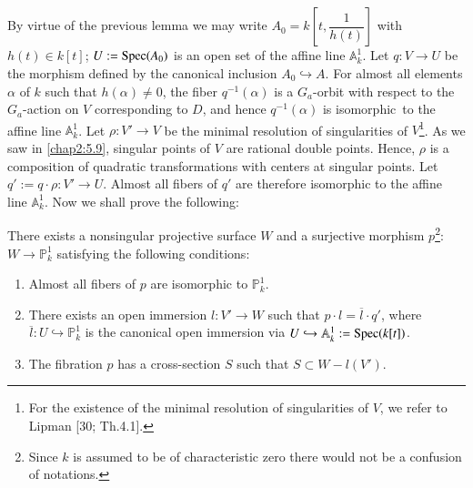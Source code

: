 \subsection{}\label{chap2:5.17}
By virtue of the previous lemma we may write
$A_{0}=k\left[t,\dfrac{1}{h(t)}\right]$ with $h(t)\in k[t]$; $U:=\operatorname{Spec}(A_{0})$ is
an open set of the affine line $\mathbb{A}^{1}_{k}$. Let $q:V\to U$ be
the morphism defined by the canonical inclusion $A_{0}\hookrightarrow
A$. For almost all elements $\alpha$ of $k$ such that $h(\alpha)\neq
0$, the fiber $q^{-1}(\alpha)$ is a $G_{a}$-orbit with respect to the
$G_{a}$-action on $V$ corresponding to $D$, and hence $q^{-1}(\alpha)$
is isomorphic\pageoriginale\ to the affine line
$\mathbb{A}^{1}_{k}$. Let $\rho:V'\to V$ be the minimal resolution of
singularities of $V$\footnote{For the existence of the minimal
  resolution of singularities of $V$, we refer to Lipman [30; Th.\@ 4.1].}. As we saw in \ref{chap2:5.9}, singular points
of $V$ are rational double points. Hence, $\rho$ is a composition of
quadratic transformations with centers at singular points. Let
$q':=q\cdot\rho:V'\to U$. Almost all fibers of $q'$ are therefore
isomorphic to the affine line $\mathbb{A}^{1}_{k}$. Now we shall prove
the following:

\begin{lemma*}
There exists a nonsingular projective surface $W$ and a surjective
morphism $p$\footnote{Since $k$ is assumed to be of characteristic
  zero there would not be a confusion of notations.}:$W\to
\mathbb{P}^{1}_{k}$ satisfying the following conditions:
\begin{enumerate}
\renewcommand{\labelenumi}{\rm(\theenumi)}
\item Almost all fibers of $p$ are isomorphic to $\mathbb{P}^{1}_{k}$.

\item There exists an open immersion $l:V'\to W$ such that $p\cdot
  l=\overline{l}\cdot q'$, where $\overline{l}:U\hookrightarrow
  \mathbb{P}^{1}_{k}$ is the canonical open immersion via
  $U\hookrightarrow \mathbb{A}^{1}_{k}:=\operatorname{Spec}(k[t])$.

\item The fibration $p$ has a cross-section $S$ such that $S\subset
  W-l(V')$. 
\end{enumerate}
\end{lemma*}


